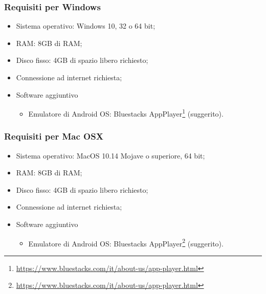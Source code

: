 \subsubsection{Requisiti per Windows}
\label{sec:requisiti_win}
\begin{itemize}
	\item Sistema operativo: Windows 10, 32 o 64 bit;
	\item RAM: 8GB di RAM;
	\item Disco fisso: 4GB di spazio libero richiesto;
	\item Connessione ad internet richiesta;
	\item Software aggiuntivo
	\begin{itemize}
		\item Emulatore di Android OS: Bluestacks AppPlayer\footnote{\href{https://www.bluestacks.com/it/about-us/app-player.html}{https://www.bluestacks.com/it/about-us/app-player.html}} (suggerito).
	\end{itemize}
\end{itemize}
\subsubsection{Requisiti per Mac OSX}
\label{sec:requisiti_mac}
\begin{itemize}
	\item Sistema operativo: MacOS 10.14 Mojave o superiore, 64 bit;
	\item RAM: 8GB di RAM;
	\item Disco fisso: 4GB di spazio libero richiesto;
	\item Connessione ad internet richiesta;
	\item Software aggiuntivo
	\begin{itemize}
		\item Emulatore di Android OS: Bluestacks AppPlayer\footnote{\href{https://www.bluestacks.com/it/about-us/app-player.html}{https://www.bluestacks.com/it/about-us/app-player.html}} (suggerito).
	\end{itemize}
\end{itemize}
